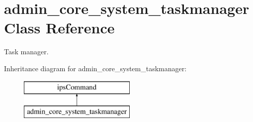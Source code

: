 \hypertarget{classadmin__core__system__taskmanager}{\section{admin\-\_\-core\-\_\-system\-\_\-taskmanager Class Reference}
\label{classadmin__core__system__taskmanager}
}


Task manager.  


Inheritance diagram for admin\-\_\-core\-\_\-system\-\_\-taskmanager\-:\begin{figure}[H]
\begin{center}
\leavevmode
\includegraphics[height=2.000000cm]{classadmin__core__system__taskmanager}
\end{center}
\end{figure}
